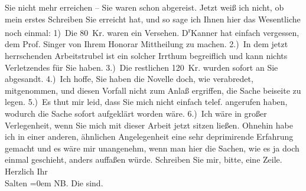 \begin{ledgroupsized}[t]{13cm}
               Sie nicht mehr erreichen – Sie waren schon abgereist. Jetzt weiß ich nicht, ob mein
               erstes Schreiben Sie erreicht hat, und so sage ich Ihnen hier das Wesentliche noch
               einmal: 1) Die 80 Kr. waren ein Versehen. D\textsuperscript{r}Kanner hat einfach vergessen, dem Prof. Singer von Ihrem Honorar Mittheilung zu machen.
               2.) In dem jetzt herrschenden Arbeitstrubel ist ein solcher Irrthum begreiflich und
               kann nichts Verletzendes für Sie haben. 3.) Die restlichen 120 Kr. wurden sofort an
               Sie abgesandt. 4.) Ich hoffe, Sie haben die Novelle doch, wie verabredet, mitgenommen, und diesen
               Vorfall nicht zum Anlaß ergriffen, die Sache beiseite zu legen. 5.) Es thut mir leid,
               dass Sie mich nicht einfach telef. angerufen haben, wodurch die Sache sofort
               aufgeklärt worden wäre. 6.) Ich wäre in großer Verlegenheit, wenn Sie mich mit dieser
               Arbeit jetzt sitzen ließen. \pend
           \pstart
           Ohnehin habe ich in einer anderen, ähnlichen Angelegenheit eine sehr deprimirende
               Erfahrung gemacht und es wäre mir unangenehm, wenn man hier die Sachen, wie es ja
               doch einmal geschieht, anders auffaßen würde. Schreiben Sie mir, bitte, eine Zeile. \pend
           \pstart
           Herzlich Ihr {\\[\baselineskip]}\spacefill\mbox{Salten}\pend
           \leftskip=0em{}\pstart
           \noindent{}NB. Die \label{K_L03334-3333v}\label{K_L03334-3333h} sind. \pend
           
         
         \endnumbering{}\end{ledgroupsized}\begin{anhang}\end{anhang}\newcommand{\dateiname}{L03334}\newcommand{\titel}{Felix Salten an Arthur Schnitzler, 4. 9. 1902}\newcommand{\editorInnen}{Martin Anton Müller und Laura Untner}
      